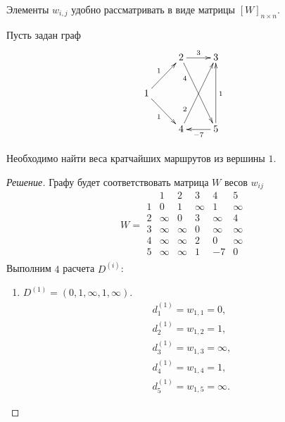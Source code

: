 Элементы $w_{i,j}$ удобно рассматривать в виде матрицы $[W]_{n\times n}$.
\begin{exampl}
    Пусть задан граф 
    \[    
        {\xymatrix{
            *{}
                &2 \ar@{->}[r]^3 \ar@{->}[ddr]_(.25){4}
                    &3
                        \\
            1 \ar@{->}[ur]^1 \ar@{->}[dr]_1
                &*{}
                    &*{}
                        \\
            *{}
                &4 \ar@{->}[uur]^(.25){2}
                    &5 \ar@{->}[l]^{-7} \ar@{->}[uu]_{1}
        }}
    \]    
    
    Необходимо найти веса кратчайших маршрутов из вершины $1$.
\end{exampl}
\begin{proof}[Решение]
    Графу будет соответствовать матрица $W$ весов $w_{ij}$
    \[
        W =
        \begin{array}{c|cccccc}
                &1      &2      &3      &4      &5      \\ \hline
            1   &0      &1      &\infty &1      &\infty \\
            2   &\infty &0      &3      &\infty &4      \\
            3   &\infty &\infty &0      &\infty &\infty \\
            4   &\infty &\infty &2      &0      &\infty \\
            5   &\infty &\infty &1      &-7     &0      \\
        \end{array}
    \]
    Выполним $4$ расчета $D^{(i)}$:
    \begin{enumerate}
        \item $D^{(1)}=(0,1,\infty,1,\infty)$. 
        \[
            \begin{split}
                d_1^{(1)}=w_{1,1}=0,\\
                d_2^{(1)}=w_{1,2}=1,\\
                d_3^{(1)}=w_{1,3}=\infty,\\
                d_4^{(1)}=w_{1,4}=1,\\
                d_5^{(1)}=w_{1,5}=\infty.
            \end{split}
        \]
        

\end{enumerate}
\end{proof}
